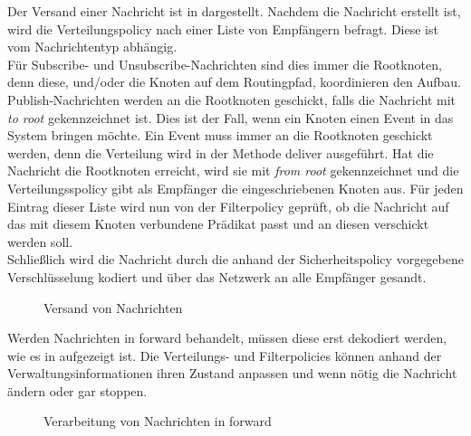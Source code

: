 Der Versand einer Nachricht ist in  dargestellt. Nachdem die Nachricht erstellt ist, wird die Verteilungspolicy nach einer Liste von Empfängern befragt. Diese ist vom Nachrichtentyp abhängig.\\
Für Subscribe- und Unsubscribe-Nachrichten sind dies immer die Rootknoten, denn diese, und/oder die Knoten auf dem Routingpfad, koordinieren den Aufbau.\\
Publish-Nachrichten werden an die Rootknoten geschickt, falls die Nachricht mit \emph{to root} gekennzeichnet ist. Dies ist der Fall, wenn ein Knoten einen Event in das System bringen möchte. Ein Event muss  immer an die Rootknoten geschickt werden, denn die Verteilung wird in der Methode deliver ausgeführt. Hat die Nachricht die Rootknoten erreicht, wird sie mit \emph{from root} gekennzeichnet und die Verteilungsspolicy gibt als Empfänger die eingeschriebenen Knoten aus. Für jeden Eintrag dieser Liste wird nun von der Filterpolicy geprüft, ob die Nachricht auf das mit diesem Knoten verbundene Prädikat passt und an diesen verschickt werden soll.\\
Schließlich wird die Nachricht durch die anhand der Sicherheitspolicy vorgegebene Verschlüsselung kodiert und über das Netzwerk an alle Empfänger gesandt.

\begin{figure}[htbp]
\centering
{}
\caption{Versand von Nachrichten}
\label{fig:processing_send}
\end{figure}

Werden Nachrichten in forward behandelt, müssen diese erst dekodiert werden, wie es in  aufgezeigt ist. Die Verteilungs- und Filterpolicies können anhand der Verwaltungsinformationen ihren Zustand anpassen und wenn nötig die Nachricht ändern oder gar stoppen.

\begin{figure}[htbp]
\centering
{}
\caption{Verarbeitung von Nachrichten in forward}
\label{fig:processing_forward}
\end{figure}

